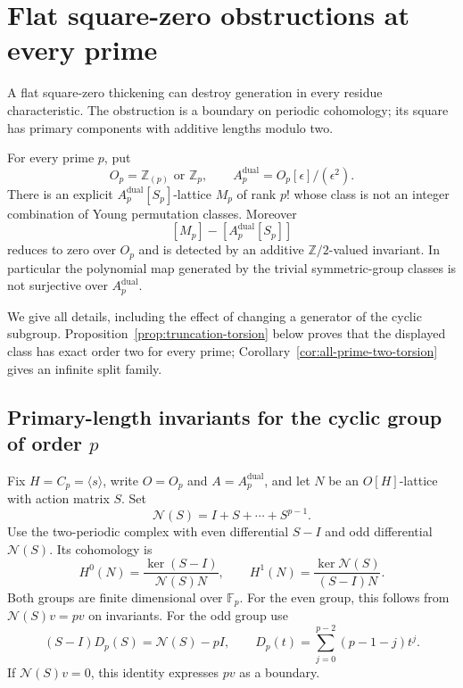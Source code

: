 \section{Flat square-zero obstructions at every prime}
\label{sec:dual-numbers-all-primes}

A flat square-zero thickening can destroy generation in every residue
characteristic.  The obstruction is a boundary on periodic cohomology;
its square has primary components with additive lengths modulo two.

\begin{theorem}
\label{thm:dual-numbers-all-primes}
For every prime $p$, put
\[
 O_p=\mathbb Z_{(p)}\text{ or }\mathbb Z_p,\qquad
 A_p^{\mathrm{dual}}=O_p[\epsilon]/(\epsilon^2).
\]
There is an explicit $A_p^{\mathrm{dual}}[S_p]$-lattice $M_p$ of rank $p!$
whose class is not an integer combination of Young permutation classes.
Moreover
\[
 [M_p]-[A_p^{\mathrm{dual}}[S_p]]
\]
reduces to zero over $O_p$ and is detected by an additive
$\mathbb Z/2$-valued invariant.  In particular the polynomial map generated
by the trivial symmetric-group classes is not surjective over
$A_p^{\mathrm{dual}}$.
\end{theorem}

We give all details, including the effect of changing a generator of the
cyclic subgroup.  Proposition~\ref{prop:truncation-torsion} below
proves that the displayed class has exact order two for every prime;
Corollary~\ref{cor:all-prime-two-torsion} gives an infinite split family.

\subsection{Primary-length invariants for the cyclic group of order \texorpdfstring{$p$}{p}}

Fix $H=C_p=\langle s\rangle$, write $O=O_p$ and $A=A_p^{\mathrm{dual}}$,
and let $N$ be an $O[H]$-lattice with action matrix $S$.  Set
\[
 \mathcal N(S)=I+S+\cdots+S^{p-1}.
\]
Use the two-periodic complex with even differential $S-I$ and odd
differential $\mathcal N(S)$.  Its cohomology is
\[
 H^0(N)=\frac{\ker(S-I)}{\mathcal N(S)N},\qquad
 H^1(N)=\frac{\ker\mathcal N(S)}{(S-I)N}.
\]
Both groups are finite dimensional over $\mathbb F_p$.  For the even
group, this follows from $\mathcal N(S)v=pv$ on invariants.  For the odd
group use
\begin{equation}
\label{eq:dual-prime-D-identity}
 (S-I)D_p(S)=\mathcal N(S)-pI,
 \qquad
 D_p(t)=\sum_{j=0}^{p-2}(p-1-j)t^j.
\end{equation}
If $\mathcal N(S)v=0$, this identity expresses $pv$ as a boundary.

